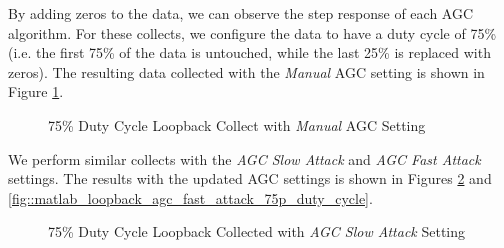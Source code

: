 \documentclass{article}
\begin{document}
By adding zeros to the data, we can observe the step response of each AGC algorithm. For these collects, we configure the data to have a duty cycle of 75\% (i.e. the first 75\% of the data is untouched, while the last 25\% is replaced with zeros). The resulting data collected with the \textit{Manual} AGC setting is shown in Figure \ref{fig::matlab_loopback_agc_manual_75p_duty_cycle}.

\begin{figure}[H]
	\centerline{}
	\caption{75\% Duty Cycle Loopback Collect with \textit{Manual} AGC Setting}
	\label{fig::matlab_loopback_agc_manual_75p_duty_cycle}
\end{figure}

We perform similar collects with the \textit{AGC Slow Attack} and \textit{AGC Fast Attack} settings. The results with the updated AGC settings is shown in Figures \ref{fig::matlab_loopback_agc_slow_attack_75p_duty_cycle} and \ref{fig::matlab_loopback_agc_fast_attack_75p_duty_cycle}.

\begin{figure}[H]
	\centerline{}
	\caption{75\% Duty Cycle Loopback Collected with \textit{AGC Slow Attack} Setting}
	\label{fig::matlab_loopback_agc_slow_attack_75p_duty_cycle}
\end{figure}
\end{document}
